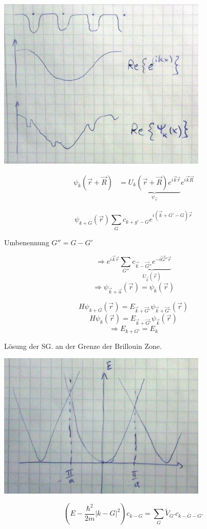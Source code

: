 \includegraphics[width=0.75\textwidth]{kap06_35.png}
 
\begin{align}
\psi_k(\vec r+\vec R) &= \underbrace{U_k(\vec r+\vec R)e^{i\vec k\vec r}}_{\psi_{\vec r}}e^{i\vec k\vec R}
\end{align}

\[\psi_{k+G}(\vec r) \sum_G c_{k+g'-G}e^{i(\vec k+G'-G)\vec r}\]

Umbenennung \(G''=G-G'\)

\[\Rightarrow e^{i\vec k\vec r}\sum_{G''} \underbrace{c_{\vec k-\vec G''}e^{-i\vec G''\vec r}}_{U_{\vec k}(\vec r)}\]
\[\Rightarrow \psi_{\vec k+\vec a}(\vec r) = \psi_k(\vec r)\]

\[H\psi_{k+G}(\vec r) = E_{\vec k+\vec G'}\psi_{\vec k+\vec G'}(\vec r)\]
\[H\psi_{k}(\vec r) = E_{\vec k+\vec G'}\psi_{\vec k}(\vec r)\]
\[\Rightarrow E_{k+G'}=E_k\]

Lösung der SG. an der Grenze der Brillouin Zone. 

\includegraphics[width=0.75\textwidth]{kap06_36.png}

\[(E-\frac{\hbar^2}{2m}|k-G|^2 )c_{k-G}=\sum_G \tilde V_{G'}c_{k-G-G'}\]


